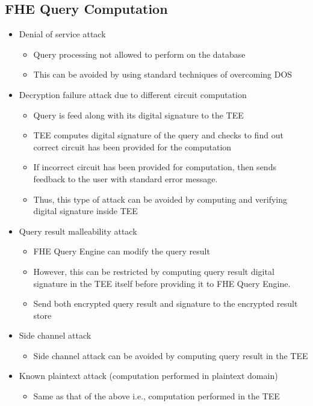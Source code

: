 \subsection{FHE Query Computation}
\begin{itemize}
    \item Denial of service attack
          \begin{itemize}
              \item Query processing not allowed to perform on the database
              \item This can be avoided by using standard techniques of overcoming DOS
          \end{itemize}
    \item Decryption failure attack due to different circuit computation
          \begin{itemize}
              \item Query is feed along with its digital signature to the TEE
              \item TEE computes digital signature of the query and checks to find out correct circuit has been provided for the computation
              \item If incorrect circuit has been provided for computation, then sends feedback to the user with standard error message.
              \item Thus, this type of attack can be avoided by computing and verifying digital signature inside TEE
          \end{itemize}
    \item Query result malleability attack
          \begin{itemize}
              \item FHE Query Engine can modify the query result
              \item However, this can be restricted by computing query result digital signature in the TEE itself before providing it to FHE Query Engine.
              \item Send both encrypted query result and signature to the encrypted result store
          \end{itemize}
    \item Side channel attack
          \begin{itemize}
              \item Side channel attack can be avoided by computing query result in the TEE
          \end{itemize}
    \item Known plaintext attack (computation performed in plaintext domain)
          \begin{itemize}
              \item  Same as that of the above i.e., computation performed in the TEE
          \end{itemize}
\end{itemize}

